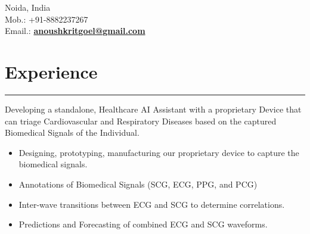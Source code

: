\documentclass[]{rahulworld-resume}
\begin{document}
\hfill
\begin{minipage}[t]{0.66\textwidth} 
\hspace*{0pt}\hfill \\
\hspace*{0pt}\hfill \\
\hspace*{0pt}\hfill Noida, India \\
\hspace*{0pt}\hfill Mob.: +91-8882237267 \\
\hspace*{0pt}\hfill Email.: \textbf{\href{mailto:anoushkritgoel@gmail.com}{anoushkritgoel@gmail.com}} \\

\section{Experience}
\noindent\rule{12.5cm}{0.4pt}

 
\hspace{5em}
\begin{minipage}{1.00\textwidth\vspace{2pt}}
Developing a standalone, Healthcare AI Assistant with a proprietary Device that can triage Cardiovascular and Respiratory Diseases based on the captured Biomedical Signals of the Individual.
\begin{itemize}
  \setlength{\itemsep}{0.1pt}
  \item Designing, prototyping, manufacturing our proprietary device to capture the biomedical signals.
  \item Annotations of Biomedical Signals (SCG, ECG, PPG, and PCG)
  \item Inter-wave transitions between ECG and SCG to determine correlations. 
  \item Predictions and Forecasting of combined ECG and SCG waveforms.
\end{itemize}
\end{minipage}

\sectionsep


\end{minipage}
\end{document}

